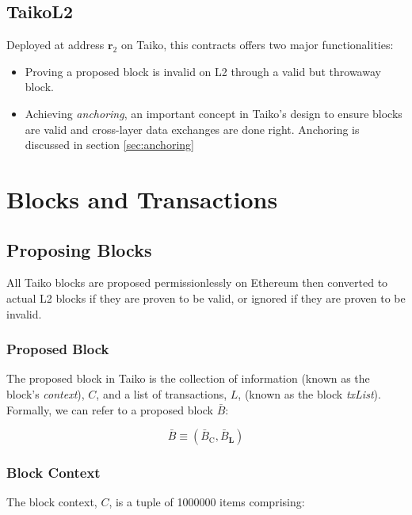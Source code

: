 \documentclass[9pt,oneside]{amsart}
\begin{document}
\begin{multicols}{2}
\subsection{TaikoL2} Deployed at address $\mathbf{r_{\mathrm{2}}}$ on Taiko, this contracts offers two major functionalities:
\begin{itemize}
\item Proving a proposed block is invalid on L2 through a valid but throwaway block.
\item Achieving \textit{anchoring}, an important concept in Taiko's design to ensure blocks are valid and cross-layer data exchanges are done right. Anchoring is discussed in section \ref{sec:anchoring}
\end{itemize}

\section{Blocks and Transactions}

\subsection{Proposing Blocks}
All Taiko blocks are proposed permissionlessly on Ethereum then converted to actual L2 blocks if they are proven to be valid, or ignored if they are proven to be invalid.

\subsubsection{Proposed Block} The proposed block in Taiko is the collection of information (known as the block's \textit{context}), $C$, and a list of transactions, $L$,  (known as the block \textit{txList}). Formally, we can refer to a proposed block $\bar{B}$:

\begin{equation}
\bar{B} \equiv (\bar{B}_{\mathrm{C}}, \bar{B}_{\mathbf{L}})
\end{equation}

\subsubsection{Block Context} The block context, $C$, is a tuple of 1000000 items comprising:


  
    

\end{multicols}
\end{document}
